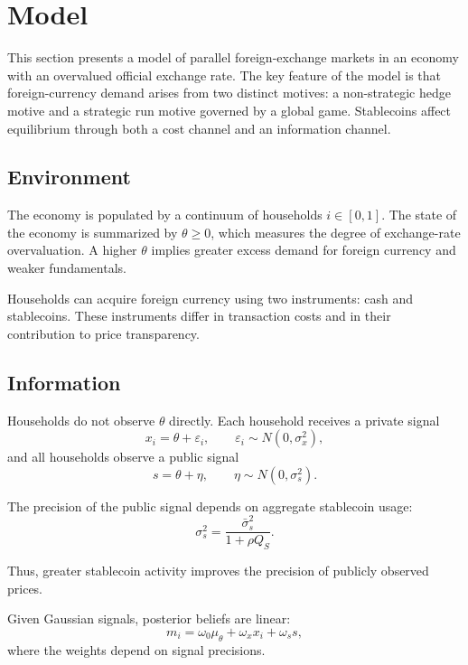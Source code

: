 \section{Model}

This section presents a model of parallel foreign-exchange markets in an economy with an overvalued official exchange rate. The key feature of the model is that foreign-currency demand arises from two distinct motives: a non-strategic hedge motive and a strategic run motive governed by a global game. Stablecoins affect equilibrium through both a cost channel and an information channel.

\subsection{Environment}

The economy is populated by a continuum of households $i \in [0,1]$. The state of the economy is summarized by $\theta \ge 0$, which measures the degree of exchange-rate overvaluation. A higher $\theta$ implies greater excess demand for foreign currency and weaker fundamentals.

Households can acquire foreign currency using two instruments: cash and stablecoins. These instruments differ in transaction costs and in their contribution to price transparency.

\subsection{Information}

Households do not observe $\theta$ directly. Each household receives a private signal
\begin{equation}
 x_i = \theta + \varepsilon_i, \qquad \varepsilon_i \sim N(0,\sigma_x^2),
\end{equation}
and all households observe a public signal
\begin{equation}
 s = \theta + \eta, \qquad \eta \sim N(0,\sigma_s^2).
\end{equation}

The precision of the public signal depends on aggregate stablecoin usage:
\begin{equation}
 \sigma_s^2 = \frac{\bar\sigma_s^2}{1 + \rho Q_S}.
\end{equation}

Thus, greater stablecoin activity improves the precision of publicly observed prices.

Given Gaussian signals, posterior beliefs are linear:
\begin{equation}
 m_i = \omega_0 \mu_\theta + \omega_x x_i + \omega_s s,
\end{equation}
where the weights depend on signal precisions.

